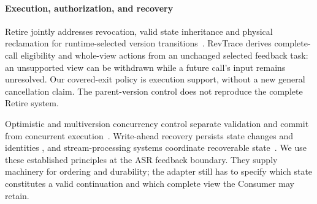 \paragraph{Execution, authorization, and recovery}
Retire jointly addresses revocation, valid state inheritance and physical
reclamation for runtime-selected version transitions~\cite{zhang2026retire}.
RevTrace derives complete-call eligibility and whole-view actions from
an unchanged selected feedback task: an unsupported view can be withdrawn
while a future call's input remains unresolved. Our covered-exit policy
is execution support, without a new general cancellation claim. The
parent-version control does not reproduce the complete Retire system.

Optimistic and multiversion concurrency control separate validation and
commit from concurrent execution~\cite{kung1981occ,bernstein1983mvcc}.
Write-ahead recovery persists state changes and identities
\cite{mohan1992aries}, and stream-processing systems coordinate recoverable
state~\cite{carbone2017flinkstate}. We use these established principles at
the ASR feedback boundary. They supply machinery for ordering and
durability; the adapter still has to specify which state constitutes a
valid continuation and which complete view the Consumer may retain.
